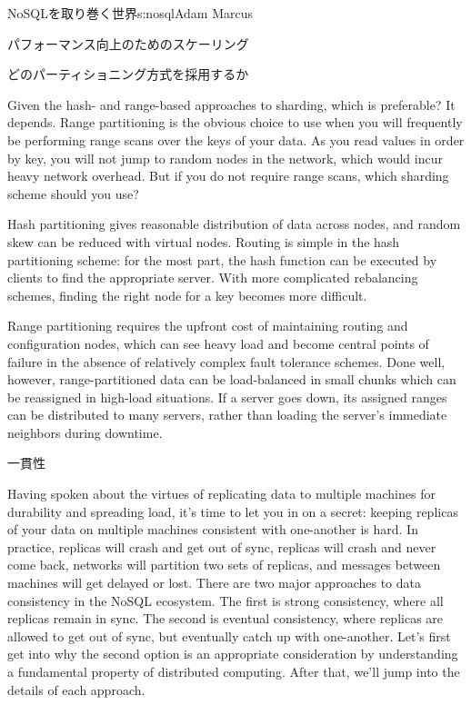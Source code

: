 \begin{aosachapter}{NoSQLを取り巻く世界}{s:nosql}{Adam Marcus}
\begin{aosasect1}{パフォーマンス向上のためのスケーリング}
\begin{aosasect2}{どのパーティショニング方式を採用するか}

Given the hash- and range-based approaches to sharding, which is
preferable?  It depends.  Range partitioning is the obvious choice to
use when you will frequently be performing range scans over the keys
of your data.  As you read values in order by key, you will not jump
to random nodes in the network, which would incur heavy network
overhead.  But if you do not require range scans, which sharding
scheme should you use?

Hash partitioning gives reasonable distribution of data across nodes,
and random skew can be reduced with virtual nodes.  Routing is simple
in the hash partitioning scheme: for the most part, the hash function
can be executed by clients to find the appropriate server.  With more
complicated rebalancing schemes, finding the right node for a key
becomes more difficult.

Range partitioning requires the upfront cost of maintaining
routing and configuration nodes, which can see heavy load and become
central points of failure in the absence of relatively complex fault
tolerance schemes.  Done well, however, range-partitioned data can be
load-balanced in small chunks which can be reassigned in high-load
situations.  If a server goes down, its assigned ranges can be
distributed to many servers, rather than loading the server's
immediate neighbors during downtime.

\end{aosasect2}

\end{aosasect1}

\begin{aosasect1}{一貫性}
\label{sec.nosql.consistency}

Having spoken about the virtues of replicating data to multiple
machines for durability and spreading load, it's time to let you in on
a secret: keeping replicas of your data on multiple machines
consistent with one-another is hard.  In practice, replicas will crash
and get out of sync, replicas will crash and never come back, networks
will partition two sets of replicas, and messages between machines
will get delayed or lost.  There are two major approaches to data
consistency in the NoSQL ecosystem.  The first is strong consistency, where all
replicas remain in sync.  The second is eventual consistency, where replicas are
allowed to get out of sync, but eventually catch up with one-another.
Let's first get into why the second option is an appropriate
consideration by understanding a fundamental property of distributed
computing.  After that, we'll jump into the details of each approach.


\end{aosasect1}
\end{aosachapter}
